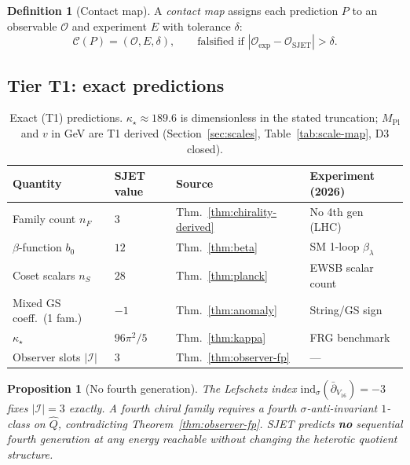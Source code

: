 \documentclass[11pt]{article}
\theoremstyle{plain}
\newtheorem{proposition}[theorem]{Proposition}
\theoremstyle{definition}
\newtheorem{definition}[theorem]{Definition}
\theoremstyle{remark}
\numberwithin{equation}{section}
\newcommand{\MPl}{M_{\mathrm{Pl}}}
\begin{document}
\begin{definition}[Contact map]\label{def:contact-map}
A \emph{contact map} assigns each prediction $P$ to an observable $\mathcal{O}$
and experiment $E$ with tolerance $\delta$:
\begin{equation}\label{eq:contact}
  \mathcal{C}(P)=(\mathcal{O},E,\delta),
  \qquad
  \text{falsified if }|\mathcal{O}_{\mathrm{exp}}-\mathcal{O}_{\mathrm{SJET}}|>\delta.
\end{equation}
\end{definition}

\subsection{Tier T1: exact predictions}
\label{sec:predictions:T1}

\begin{table}[ht]
\centering
\small
\renewcommand{\arraystretch}{1.1}
\begin{tabular}{@{}llll@{}}
\toprule
\textbf{Quantity} & \textbf{SJET value} & \textbf{Source} & \textbf{Experiment (2026)} \\
\midrule
Family count $n_F$ & $3$ & Thm.~\ref{thm:chirality-derived} & No 4th gen (LHC) \\
$\beta$-function $b_0$ & $12$ & Thm.~\ref{thm:beta} & SM 1-loop $\beta_\lambda$ \\
Coset scalars $n_S$ & $28$ & Thm.~\ref{thm:planck} & EWSB scalar count \\
Mixed GS coeff.\ (1 fam.) & $-1$ & Thm.~\ref{thm:anomaly} & String/GS sign \\
$\kappa_\star$ & $96\pi^2/5$ & Thm.~\ref{thm:kappa} & FRG benchmark \\
Observer slots $|\mathcal{I}|$ & $3$ & Thm.~\ref{thm:observer-fp} & --- \\
\bottomrule
\end{tabular}
\caption{Exact (T1) predictions. $\kappa_\star\approx189.6$ is dimensionless in
the stated truncation; $\MPl$ and $v$ in GeV are T1 derived
(Section~\ref{sec:scales}, Table~\ref{tab:scale-map}, D3 closed).}
\label{tab:predictions-T1}
\end{table}

\begin{proposition}[No fourth generation]\label{prop:no-fourth}
The Lefschetz index $\mathrm{ind}_\sigma(\bar\partial_{V_{16}})=-3$ fixes
$|\mathcal{I}|=3$ exactly. A fourth chiral family requires a fourth
$\sigma$-anti-invariant $1$-class on $\hat Q$, contradicting
Theorem~\ref{thm:observer-fp}. SJET predicts \textbf{no} sequential fourth
generation at any energy reachable without changing the heterotic quotient
structure.
\end{proposition}
\end{document}
